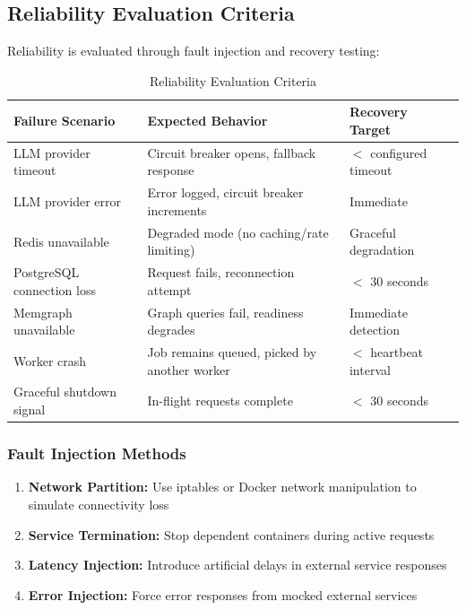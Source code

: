 \subsection{Reliability Evaluation Criteria}
\label{subsec:reliability-criteria}

Reliability is evaluated through fault injection and recovery testing:

\begin{table}[htbp]
\centering
\caption{Reliability Evaluation Criteria}
\label{tab:reliability-eval}
\small
\begin{tabularx}{\textwidth}{|l|X|l|}
\hline
\textbf{Failure Scenario} & \textbf{Expected Behavior} & \textbf{Recovery Target} \\
\hline
LLM provider timeout & Circuit breaker opens, fallback response & $<$ configured timeout \\
\hline
LLM provider error & Error logged, circuit breaker increments & Immediate \\
\hline
Redis unavailable & Degraded mode (no caching/rate limiting) & Graceful degradation \\
\hline
PostgreSQL connection loss & Request fails, reconnection attempt & $<$ 30 seconds \\
\hline
Memgraph unavailable & Graph queries fail, readiness degrades & Immediate detection \\
\hline
Worker crash & Job remains queued, picked by another worker & $<$ heartbeat interval \\
\hline
Graceful shutdown signal & In-flight requests complete & $<$ 30 seconds \\
\hline
\end{tabularx}
\end{table}

\subsubsection{Fault Injection Methods}

\begin{enumerate}
    \item \textbf{Network Partition:} Use iptables or Docker network manipulation to simulate connectivity loss
    \item \textbf{Service Termination:} Stop dependent containers during active requests
    \item \textbf{Latency Injection:} Introduce artificial delays in external service responses
    \item \textbf{Error Injection:} Force error responses from mocked external services
\end{enumerate}

